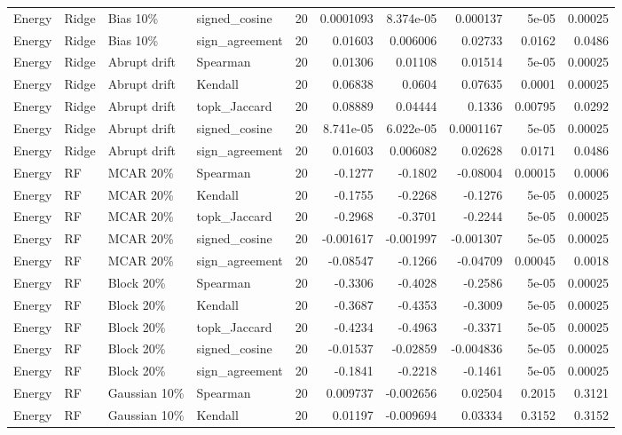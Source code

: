 \begin{tabular}{llllrrrrrr}
Energy & Ridge & Bias 10\% & signed\_cosine & 20 & 0.0001093 & 8.374e-05 & 0.000137 & 5e-05 & 0.00025 \\
Energy & Ridge & Bias 10\% & sign\_agreement & 20 & 0.01603 & 0.006006 & 0.02733 & 0.0162 & 0.0486 \\
Energy & Ridge & Abrupt drift & Spearman & 20 & 0.01306 & 0.01108 & 0.01514 & 5e-05 & 0.00025 \\
Energy & Ridge & Abrupt drift & Kendall & 20 & 0.06838 & 0.0604 & 0.07635 & 0.0001 & 0.00025 \\
Energy & Ridge & Abrupt drift & topk\_Jaccard & 20 & 0.08889 & 0.04444 & 0.1336 & 0.00795 & 0.0292 \\
Energy & Ridge & Abrupt drift & signed\_cosine & 20 & 8.741e-05 & 6.022e-05 & 0.0001167 & 5e-05 & 0.00025 \\
Energy & Ridge & Abrupt drift & sign\_agreement & 20 & 0.01603 & 0.006082 & 0.02628 & 0.0171 & 0.0486 \\
Energy & RF & MCAR 20\% & Spearman & 20 & -0.1277 & -0.1802 & -0.08004 & 0.00015 & 0.0006 \\
Energy & RF & MCAR 20\% & Kendall & 20 & -0.1755 & -0.2268 & -0.1276 & 5e-05 & 0.00025 \\
Energy & RF & MCAR 20\% & topk\_Jaccard & 20 & -0.2968 & -0.3701 & -0.2244 & 5e-05 & 0.00025 \\
Energy & RF & MCAR 20\% & signed\_cosine & 20 & -0.001617 & -0.001997 & -0.001307 & 5e-05 & 0.00025 \\
Energy & RF & MCAR 20\% & sign\_agreement & 20 & -0.08547 & -0.1266 & -0.04709 & 0.00045 & 0.0018 \\
Energy & RF & Block 20\% & Spearman & 20 & -0.3306 & -0.4028 & -0.2586 & 5e-05 & 0.00025 \\
Energy & RF & Block 20\% & Kendall & 20 & -0.3687 & -0.4353 & -0.3009 & 5e-05 & 0.00025 \\
Energy & RF & Block 20\% & topk\_Jaccard & 20 & -0.4234 & -0.4963 & -0.3371 & 5e-05 & 0.00025 \\
Energy & RF & Block 20\% & signed\_cosine & 20 & -0.01537 & -0.02859 & -0.004836 & 5e-05 & 0.00025 \\
Energy & RF & Block 20\% & sign\_agreement & 20 & -0.1841 & -0.2218 & -0.1461 & 5e-05 & 0.00025 \\
Energy & RF & Gaussian 10\% & Spearman & 20 & 0.009737 & -0.002656 & 0.02504 & 0.2015 & 0.3121 \\
Energy & RF & Gaussian 10\% & Kendall & 20 & 0.01197 & -0.009694 & 0.03334 & 0.3152 & 0.3152 \\

\end{tabular}
